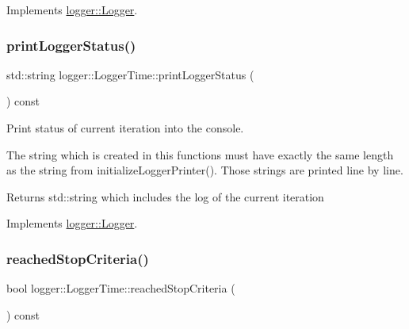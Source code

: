 Implements \hyperlink{classlogger_1_1_logger_a91d987a86698e455b6fd3468f266d3fe}{logger\+::\+Logger}.

\mbox{\label{classlogger_1_1_logger_time_a22bef2a992b88689d7748c4017e17d19}} 
\subsubsection{\texorpdfstring{print\+Logger\+Status()}{printLoggerStatus()}}
{\footnotesize\ttfamily std\+::string logger\+::\+Logger\+Time\+::print\+Logger\+Status (\begin{DoxyParamCaption}{ }\end{DoxyParamCaption}) const\hspace{0.3cm}{\ttfamily [virtual]}}



Print status of current iteration into the console. 

The string which is created in this functions must have exactly the same length as the string from {\ttfamily initialize\+Logger\+Printer()}. Those strings are printed line by line.

\begin{DoxyReturn}{Returns}
{\ttfamily std\+::string} which includes the log of the current iteration 
\end{DoxyReturn}


Implements \hyperlink{classlogger_1_1_logger_abad818a7e8053ca84cb267e883b5e377}{logger\+::\+Logger}.

\mbox{\label{classlogger_1_1_logger_time_a727f16a2deed4d64293844615f18df08}} 
\subsubsection{\texorpdfstring{reached\+Stop\+Criteria()}{reachedStopCriteria()}}
{\footnotesize\ttfamily bool logger\+::\+Logger\+Time\+::reached\+Stop\+Criteria (\begin{DoxyParamCaption}{ }\end{DoxyParamCaption}) const\hspace{0.3cm}{\ttfamily [virtual]}}



